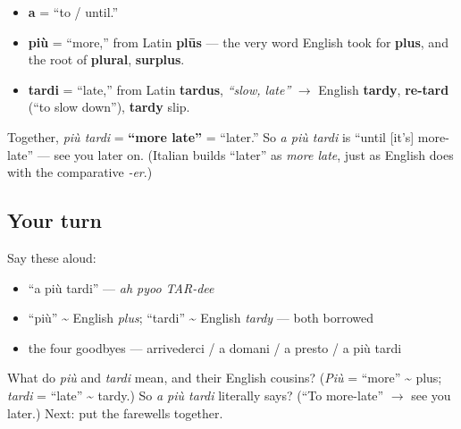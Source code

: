 \begin{cousinweb}
\begin{itemize}
\raggedright
  \item \textbf{a} = \textquotedblleft{}to / until.\textquotedblright{}
  \item \textbf{più} = \textquotedblleft{}more,\textquotedblright{} from Latin \textbf{plūs} — the very word English took for \textbf{plus}, and the root of \textbf{plural}, \textbf{surplus}.
  \item \textbf{tardi} = \textquotedblleft{}late,\textquotedblright{} from Latin \textbf{tardus}, \emph{\textquotedblleft{}slow, late\textquotedblright{}} $\to$ English \textbf{tardy}, \textbf{re-tard} (\textquotedblleft{}to slow down\textquotedblright{}), \textbf{tardy} slip.
\end{itemize}

Together, \emph{più tardi} = \textbf{\textquotedblleft{}more late\textquotedblright{}} = \textquotedblleft{}later.\textquotedblright{} So \emph{a più tardi} is \textquotedblleft{}until {[}it's{]} more-late\textquotedblright{} — see you later on. (Italian builds \textquotedblleft{}later\textquotedblright{} as \emph{more late}, just as English does with the comparative \emph{-er}.)
\end{cousinweb}

\subsection*{Your turn}
Say these aloud:

\begin{itemize}
\raggedright
  \item \textquotedblleft{}a più tardi\textquotedblright{} — \emph{ah pyoo TAR-dee}
  \item \textquotedblleft{}più\textquotedblright{} \textasciitilde{} English \emph{plus}; \textquotedblleft{}tardi\textquotedblright{} \textasciitilde{} English \emph{tardy} — both borrowed
  \item the four goodbyes — arrivederci / a domani / a presto / a più tardi
\end{itemize}

\begin{tcolorbox}[breakable,colback=teal!4,colframe=teal!35!black,title={Before you move on}]
What do \emph{più} and \emph{tardi} mean, and their English cousins? (\emph{Più} = \textquotedblleft{}more\textquotedblright{} \textasciitilde{} plus; \emph{tardi} = \textquotedblleft{}late\textquotedblright{} \textasciitilde{} tardy.) So \emph{a più tardi} literally says? (\textquotedblleft{}To more-late\textquotedblright{} $\to$ see you later.) Next: put the farewells together.
\end{tcolorbox}
